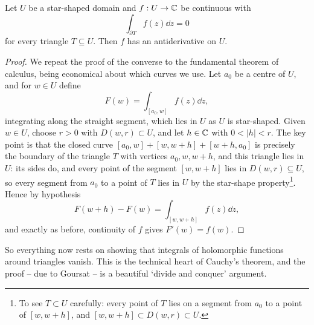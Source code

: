 \documentclass[a4paper]{scrartcl}
\begin{document}
\begin{corollary}
    Let $U$ be a star-shaped domain and $f: U \rightarrow \mathbb{C}$ be continuous with
    $$
    \int_{\partial T} f(z) \dd z = 0
    $$
    for every triangle $T \subseteq U$. Then $f$ has an antiderivative on $U$.
\end{corollary}
\begin{proof}
    We repeat the proof of the converse to the fundamental theorem of calculus, being economical about which curves we use. Let $a_0$ be a centre of $U$, and for $w \in U$ define
    $$
    F(w) = \int_{[a_0, w]} f(z) \dd z,
    $$
    integrating along the straight segment, which lies in $U$ as $U$ is star-shaped.
    Given $w \in U$, choose $r > 0$ with $D(w, r) \subset U$, and let $h \in \mathbb{C}$ with $0 < |h| < r$. The key point is that the closed curve $[a_0, w] + [w, w + h] + [w + h, a_0]$ is precisely the boundary of the triangle $T$ with vertices $a_0, w, w + h$, and this triangle lies in $U$: its sides do, and every point of the segment $[w, w+h]$ lies in $D(w, r) \subseteq U$, so every segment from $a_0$ to a point of $T$ lies in $U$ by the star-shape property\footnote{To see $T \subset U$ carefully: every point of $T$ lies on a segment from $a_0$ to a point of $[w, w + h]$, and $[w, w+h] \subset D(w,r) \subset U$.}. Hence by hypothesis
    $$
    F(w + h) - F(w) = \int_{[w, w + h]} f(z) \dd z,
    $$
    and exactly as before, continuity of $f$ gives $F'(w) = f(w)$.
\end{proof}

So everything now rests on showing that integrals of holomorphic functions around triangles vanish. This is the technical heart of Cauchy's theorem, and the proof -- due to Goursat -- is a beautiful `divide and conquer' argument.
\end{document}
